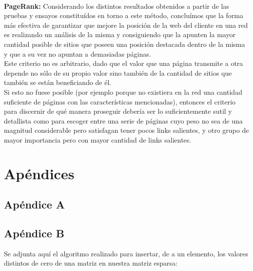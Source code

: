 \documentclass[a4paper]{article}
\begin{document}
\\
\indent  \textbf{PageRank:} Considerando los distintos resultados obtenidos a partir de las pruebas y ensayos constituídos en torno a este método, concluímos que la forma más efectiva de garantizar que mejore la posición de la web del cliente en una red es realizando un análisis de la misma y consiguiendo que la apunten la mayor cantidad posible de sitios que poseen una posición destacada dentro de la misma y que a su vez no apuntan a demasiadas páginas. \\
\indent Este criterio no es arbitrario, dado que el valor que una página transmite a otra depende no sólo de su propio valor sino también de la cantidad de sitios que también se están beneficiando de él. \\
\indent Si esto no fuese posible (por ejemplo porque no existiera en la red una cantidad suficiente de páginas con las características mencionadas), entonces el criterio para discernir de qué manera proseguir debería ser lo suficientemente sutil y detallista como para escoger entre una serie de páginas cuyo peso no sea de una magnitud considerable pero satisfagan tener pocos links salientes, y otro grupo de mayor importancia pero con mayor cantidad de links salientes.\\

\newpage
\section{Ap\'endices}
	\subsection{Ap\'endice A}

		
\newpage
	\subsection{Ap\'endice B}
Se adjunta aqu\'i el algoritmo realizado para insertar, de a un elemento, los valores distintos de cero de una matriz en nuestra matriz esparsa: \\
\end{document}
